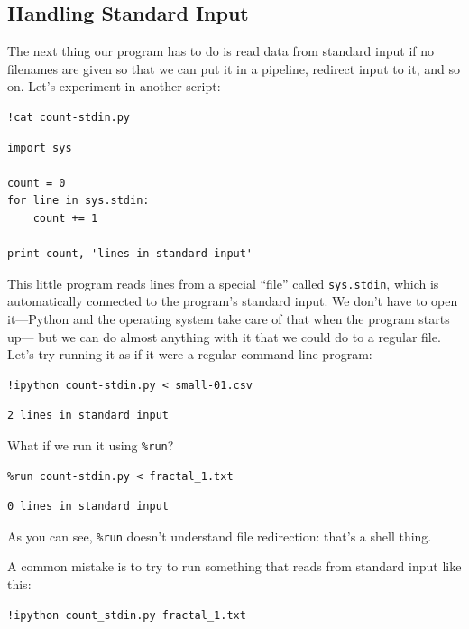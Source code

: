 \documentclass{book}
\begin{document}
\subsection{Handling Standard Input}

The next thing our program has to do is read data from standard input if
no filenames are given so that we can put it in a pipeline, redirect
input to it, and so on. Let's experiment in another script:

\begin{verbatim}
!cat count-stdin.py
\end{verbatim}

\begin{verbatim}
import sys

count = 0
for line in sys.stdin:
    count += 1

print count, 'lines in standard input'
\end{verbatim}

This little program reads lines from a special ``file'' called
\texttt{sys.stdin}, which is automatically connected to the program's
standard input. We don't have to open it---Python and the operating
system take care of that when the program starts up--- but we can do
almost anything with it that we could do to a regular file. Let's try
running it as if it were a regular command-line program:

\begin{verbatim}
!ipython count-stdin.py < small-01.csv
\end{verbatim}

\begin{verbatim}
2 lines in standard input
\end{verbatim}

What if we run it using \texttt{\%run}?

\begin{verbatim}
%run count-stdin.py < fractal_1.txt
\end{verbatim}

\begin{verbatim}
0 lines in standard input
\end{verbatim}

As you can see, \texttt{\%run} doesn't understand file redirection:
that's a shell thing.

A common mistake is to try to run something that reads from standard
input like this:

\begin{verbatim}
!ipython count_stdin.py fractal_1.txt
\end{verbatim}
\end{document}
